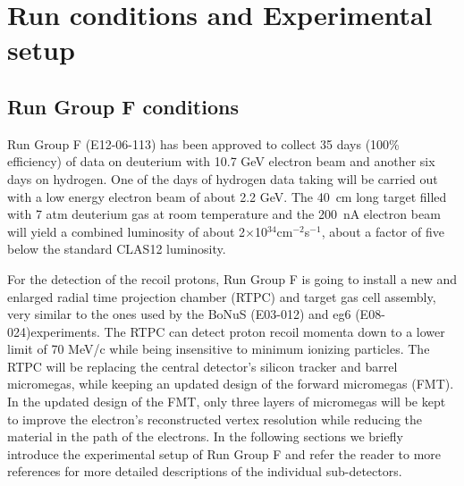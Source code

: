\chapter{Run conditions and Experimental setup}
\label{chap:physics}

\section{Run Group F conditions}

Run Group F (E12-06-113) has been approved to collect 35 days (100\% 
efficiency) of data on deuterium with 10.7 GeV electron beam and another six 
days on hydrogen. One of the days of hydrogen data taking will be carried out 
with a low energy electron beam of about 2.2 GeV. The 40~cm long target filled 
with 7 atm deuterium gas at room temperature and the 200~nA electron beam will 
yield a combined luminosity of about 2$\times$10$^{34}$cm$^{-2}$s$^{-1}$, about 
a factor of five below the standard CLAS12 luminosity.

For the detection of the recoil protons, Run Group F is going to install a new 
and enlarged radial time projection chamber (RTPC) and target gas cell 
assembly, very similar to the ones used by the BoNuS (E03-012) and eg6 
(E08-024)experiments. The RTPC can detect proton recoil momenta down to a lower 
limit of 70 MeV/c while being insensitive to minimum ionizing particles. The 
RTPC will be replacing the central detector's silicon tracker
and barrel micromegas, while keeping an updated design of the forward 
micromegas (FMT). In the updated design of the FMT, only three layers of 
micromegas will be kept to improve the electron's reconstructed vertex 
resolution while reducing the material in the path of the electrons. In the 
following sections we briefly introduce the experimental setup of Run Group F 
and refer the reader to more references for more detailed descriptions of the 
individual sub-detectors. 


